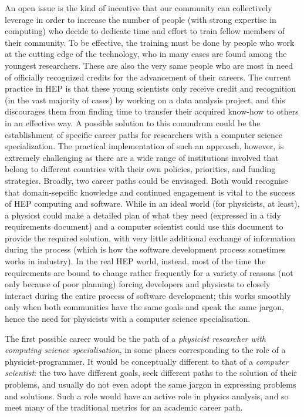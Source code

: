 \documentclass[12pt,a4paper]{article}
\begin{document}
An open issue is the kind of incentive that our community can collectively
leverage in order to increase the number of people (with strong expertise in
computing) who decide to dedicate time and effort to train fellow members of
their community.
To be effective, the training must be done by people who work at the cutting
edge of the technology, who in many cases are found among the youngest
researchers. These are also the very same people who are most in need of
officially recognized credits for the advancement of their careers. The current
practice in HEP is that these young scientists only receive credit and
recognition (in the vast majority of cases) by working on a data analysis
project, and this discourages them from finding time to transfer their acquired
know-how to others in an effective way. A possible solution to this conundrum
could be the establishment of specific career paths for researchers with a
computer science specialization. The practical implementation of such an
approach, however, is extremely challenging as there are a wide range of
institutions involved that belong to different countries with their own
policies, priorities, and funding strategies. Broadly, two career paths could be
envisaged. Both would recognise that domain-sepcific knowledge and continued
engagement is vital to the success of HEP computing and software. While in an
ideal world (for physicists, at least), a physicst could make a detailed plan of
what they need (expressed in a tidy requirements document) and a computer
scientist could use this document to provide the required solution, with very
little additional exchange of information during the process (which is how the
software development process sometimes works in industry). In the real HEP
world, instead, most of the time the requirements are bound to change rather
frequently for a variety of reasons (not only because of poor planning) forcing
developers and physicsts to closely interact during the entire process of
software development; this works smoothly only when both communities have the
same goals and speak the same jargon, hence the need for physicists with a
computer science specialisation.

The first possible career would be the path of a \emph{physicist researcher with
computing science specialisation}, in some places corresponding to the role of a
physicist-programmer. It would be conceptually different to that of a
\emph{computer scientist}: the two have different goals, seek different paths to
the solution of their problems, and usually do not even adopt the same jargon in
expressing problems and solutions. Such a role would have an active role in
physics analysis, and so meet many of the traditional metrics for an academic
career path.
\end{document}
